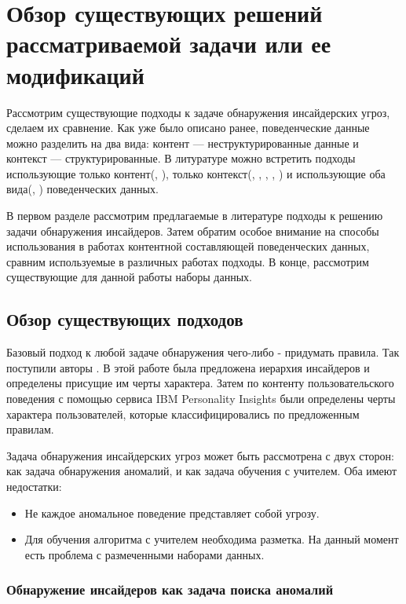 \section{Обзор существующих решений рассматриваемой зада­чи или ее модификаций}
Рассмотрим существующие подходы к задаче обнаружения инсайдерских угроз, сделаем их сравнение. Как уже было описано ранее, поведенческие данные можно разделить на два вида: контент --- неструктурированные данные и контекст --- структурированные. В литуратуре можно встретить подходы использующие только контент(\cite{rules}, \cite{absa}), только контекст(\cite{lac}, \cite{granual}, \cite{lstm_cnn}, \cite{cnn_lstm}, \cite{gru}) и использующие оба вида(\cite{anomalyalgo}, \cite{suites}) поведенческих данных.

В первом разделе рассмотрим предлагаемые в литературе подходы к решению задачи обнаружения инсайдеров. Затем обратим особое внимание на способы использования в работах контентной составляющей поведенческих данных, сравним используемые в различных работах подходы. В конце, рассмотрим существующие для данной работы наборы данных.
\subsection{Обзор существующих подходов}

Базовый подход к любой задаче обнаружения чего-либо - придумать правила. Так поступили авторы \cite{rules}. В этой работе была предложена иерархия инсайдеров и определены присущие им черты характера. Затем по контенту пользовательского поведения с помощью сервиса IBM Personality Insights были определены черты характера пользователей, которые классифицировались по предложенным правилам. 

Задача обнаружения инсайдерских угроз может быть рассмотрена с двух сторон: как задача обнаружения аномалий, и как задача обучения с учителем. Оба имеют недостатки: 
\begin{itemize}
\item Не каждое аномальное поведение представляет собой угрозу. 
\item Для обучения алгоритма с учителем необходима разметка. На данный момент есть проблема с размеченными наборами данных. 
\end{itemize}

\subsubsection{Обнаружение инсайдеров как задача поиска аномалий}

